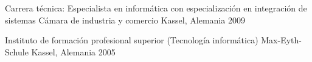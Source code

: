

\begin{cventries}

  \cventry
    {Carrera técnica: Especialista en informática con especialización en integración de sistemas} %
    {Cámara de industria y comercio} %
    {Kassel, Alemania} %
    {2009} %
    {}

  \cventry
    {Instituto de formación profesional superior (Tecnología informática)} %
    {Max-Eyth-Schule} %
    {Kassel, Alemania} %
    {2005} %
    {}

\end{cventries}
